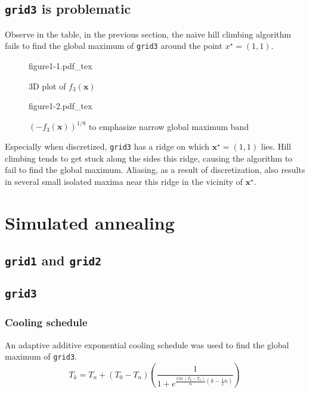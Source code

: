 \documentclass[11pt,oneside]{article}
\newcommand{\vect}[1]{\boldsymbol{#1}}
\begin{document}
\newpage

\subsection{\texttt{grid3} is problematic}

Observe in the table, in the previous section, the naive hill climbing algorithm fails
to find the global maximum of \texttt{grid3} around the point $x^\star=(1,1)$.

\begin{figure}[h!]
    \centering
    \caption{3D plot of $f_3(\vect{x})$}
    \def\svgwidth{0.6\textwidth}
    {figure1-1.pdf_tex}
\end{figure}

\begin{figure}[h!]
    \centering
    \caption{$(-f_3(\vect{x}))^{1/8}$ to emphasize narrow global maximum band}
    \def\svgwidth{0.5\textwidth}
    {figure1-2.pdf_tex}
\end{figure}

Especially when discretized, \texttt{grid3} has a ridge on which $\vect{x}^\star=(1,1)$
lies. Hill climbing tends to get stuck along the sides this ridge, causing the
algorithm to fail to find the global maximum. Aliasing, as a result of discretization,
also results in several small isolated maxima near this ridge in the vicinity of 
$\vect{x}^\star$.

\newpage

\section{Simulated annealing}

\subsection{\texttt{grid1} and \texttt{grid2}}

\subsection{\texttt{grid3}}

\subsubsection{Cooling schedule}

An adaptive additive exponential cooling schedule was used to find the global maximum 
of \texttt{grid3}. 
\begin{equation}
    T_k = T_n + (T_0 - T_n)
    \left(\frac{1}{1+e^{\frac{2\ln\left(T_0-T_n\right)}{n}
    \left(k-\frac{1}{2}n\right)}}\right)
\end{equation}
\end{document}
